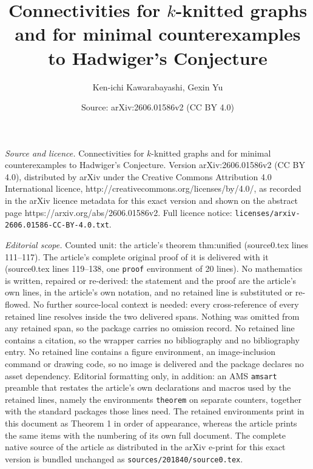 \documentclass[10pt,a4paper]{amsart}
\title{Connectivities for $k$-knitted graphs and for minimal counterexamples to Hadwiger's Conjecture}
\author{Ken-ichi Kawarabayashi, Gexin Yu}
\date{Source: arXiv:2606.01586v2 (CC BY 4.0)}
\begin{document}
\maketitle

\noindent\emph{Source and licence.} Connectivities for $k$-knitted graphs and for minimal counterexamples to Hadwiger's Conjecture. Version arXiv:2606.01586v2 (CC BY 4.0), distributed by arXiv under the Creative Commons Attribution 4.0 International licence, http://creativecommons.org/licenses/by/4.0/, as recorded in the arXiv licence metadata for this exact version and shown on the abstract page https://arxiv.org/abs/2606.01586v2. Full licence notice: \texttt{licenses/arxiv-2606.01586-CC-BY-4.0.txt}.\par\smallskip

\noindent\textit{Editorial scope.} Counted unit: the article's theorem thm:unified (source0.tex lines 111--117). The article's complete original proof of it is delivered with it (source0.tex lines 119--138, one \texttt{proof} environment of 20 lines). No mathematics is written, repaired or re-derived: the statement and the proof are the article's own lines, in the article's own notation, and no retained line is substituted or re-flowed.  No further source-local context is needed: every cross-reference of every retained line resolves inside the two delivered spans.  Nothing was omitted from any retained span, so the package carries no omission record.  No retained line contains a citation, so the wrapper carries no bibliography and no bibliography entry.  No retained line contains a figure environment, an image-inclusion command or drawing code, so no image is delivered and the package declares no asset dependency.  Editorial formatting only, in addition: an AMS \texttt{amsart} preamble that restates the article's own declarations and macros used by the retained lines, namely the environments \texttt{theorem} on separate counters, together with the standard packages those lines need.  The retained environments print in this document as Theorem 1 in order of appearance, whereas the article prints the same items with the numbering of its own full document.  The complete native source of the article as distributed in the arXiv e-print for this exact version is bundled unchanged as \texttt{sources/201840/source0.tex}.
\end{document}
